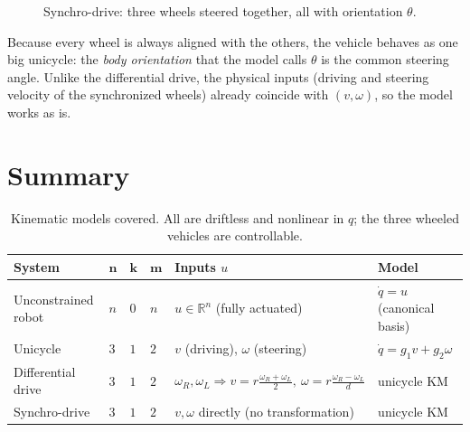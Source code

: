 \documentclass[11pt,a4paper]{article}
\newcommand{\R}{\mathbb{R}}
\newcommand{\dq}{\dot q}
\theoremstyle{definition}
\begin{document}
\begin{figure}[h]
\centering
{}
\caption{Synchro-drive: three wheels steered together, all with orientation $\theta$.}
\end{figure}

\begin{intuition}
Because every wheel is always aligned with the others, the vehicle behaves as one big unicycle: the \emph{body orientation} that the model calls $\theta$ is the common steering angle. Unlike the differential drive, the physical inputs (driving and steering velocity of the synchronized wheels) already coincide with $(v,\omega)$, so the model works as is.
\end{intuition}

\section{Summary}

\begin{table}[h]
\centering\small
\renewcommand{\arraystretch}{1.25}
\begin{tabular}{@{}p{2.9cm}p{1.2cm}p{1.2cm}p{1.2cm}p{3.3cm}p{3.2cm}@{}}
\toprule
\textbf{System} & $\boldsymbol n$ & $\boldsymbol k$ & $\boldsymbol m$ & \textbf{Inputs $u$} & \textbf{Model}\\
\midrule
Unconstrained robot & $n$ & $0$ & $n$ & $u\in\R^n$ (fully actuated) & $\dq=u$ (canonical basis)\\
Unicycle & $3$ & $1$ & $2$ & $v$ (driving), $\omega$ (steering) & $\dq=g_1v+g_2\omega$\\
Differential drive & $3$ & $1$ & $2$ & $\omega_R,\omega_L\Rightarrow v=r\frac{\omega_R+\omega_L}2,\ \omega=r\frac{\omega_R-\omega_L}d$ & unicycle KM\\
Synchro-drive & $3$ & $1$ & $2$ & $v,\omega$ directly (no transformation) & unicycle KM\\
\bottomrule
\end{tabular}
\caption{Kinematic models covered. All are driftless and nonlinear in $q$; the three wheeled vehicles are controllable.}
\end{table}
\end{document}
